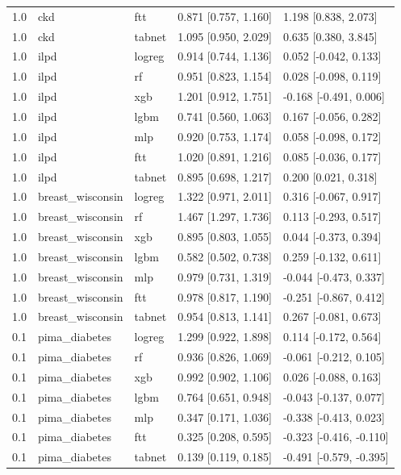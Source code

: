 \begin{table}[t]
\begin{tabular}{lllll}
1.0 & ckd & ftt & 0.871 [0.757, 1.160] & 1.198 [0.838, 2.073] \\
1.0 & ckd & tabnet & 1.095 [0.950, 2.029] & 0.635 [0.380, 3.845] \\
1.0 & ilpd & logreg & 0.914 [0.744, 1.136] & 0.052 [-0.042, 0.133] \\
1.0 & ilpd & rf & 0.951 [0.823, 1.154] & 0.028 [-0.098, 0.119] \\
1.0 & ilpd & xgb & 1.201 [0.912, 1.751] & -0.168 [-0.491, 0.006] \\
1.0 & ilpd & lgbm & 0.741 [0.560, 1.063] & 0.167 [-0.056, 0.282] \\
1.0 & ilpd & mlp & 0.920 [0.753, 1.174] & 0.058 [-0.098, 0.172] \\
1.0 & ilpd & ftt & 1.020 [0.891, 1.216] & 0.085 [-0.036, 0.177] \\
1.0 & ilpd & tabnet & 0.895 [0.698, 1.217] & 0.200 [0.021, 0.318] \\
1.0 & breast\_wisconsin & logreg & 1.322 [0.971, 2.011] & 0.316 [-0.067, 0.917] \\
1.0 & breast\_wisconsin & rf & 1.467 [1.297, 1.736] & 0.113 [-0.293, 0.517] \\
1.0 & breast\_wisconsin & xgb & 0.895 [0.803, 1.055] & 0.044 [-0.373, 0.394] \\
1.0 & breast\_wisconsin & lgbm & 0.582 [0.502, 0.738] & 0.259 [-0.132, 0.611] \\
1.0 & breast\_wisconsin & mlp & 0.979 [0.731, 1.319] & -0.044 [-0.473, 0.337] \\
1.0 & breast\_wisconsin & ftt & 0.978 [0.817, 1.190] & -0.251 [-0.867, 0.412] \\
1.0 & breast\_wisconsin & tabnet & 0.954 [0.813, 1.141] & 0.267 [-0.081, 0.673] \\
0.1 & pima\_diabetes & logreg & 1.299 [0.922, 1.898] & 0.114 [-0.172, 0.564] \\
0.1 & pima\_diabetes & rf & 0.936 [0.826, 1.069] & -0.061 [-0.212, 0.105] \\
0.1 & pima\_diabetes & xgb & 0.992 [0.902, 1.106] & 0.026 [-0.088, 0.163] \\
0.1 & pima\_diabetes & lgbm & 0.764 [0.651, 0.948] & -0.043 [-0.137, 0.077] \\
0.1 & pima\_diabetes & mlp & 0.347 [0.171, 1.036] & -0.338 [-0.413, 0.023] \\
0.1 & pima\_diabetes & ftt & 0.325 [0.208, 0.595] & -0.323 [-0.416, -0.110] \\
0.1 & pima\_diabetes & tabnet & 0.139 [0.119, 0.185] & -0.491 [-0.579, -0.395] \\

\end{tabular}
\end{table}
